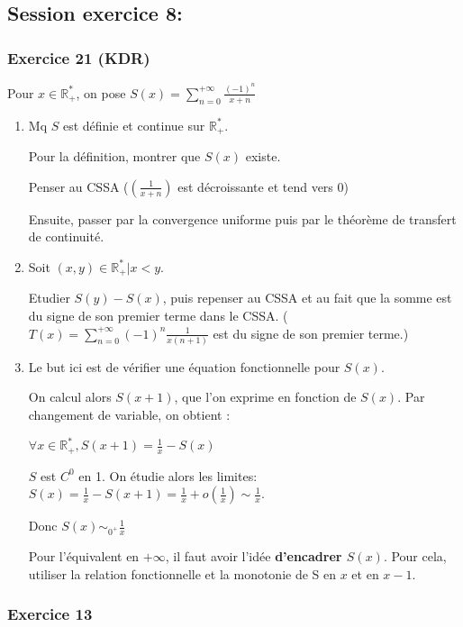 \documentclass[a4paper, 11pt, hidelinks]{article}
\begin{document}
\subsection{Session exercice 8:}


\subsubsection{Exercice 21 (KDR)}

Pour $x\in \mathbb{R}^*_+$, on pose $S(x)=\displaystyle\sum_{n=0}^{+\infty} \frac{(-1)^n}{x+n}$

\begin{enumerate}
    \item Mq $S$ est définie et continue sur $\mathbb{R}^*_+$.
    
    
    Pour la définition, montrer que $S(x)$ existe.

    Penser au CSSA ($(\frac{1}{x+n})$ est décroissante et tend vers $0$)

    Ensuite, passer par la convergence uniforme puis par le théorème de transfert de continuité.
    \item Soit $(x,y)\in \mathbb{R}^*_+ | x<y$.
    
    Etudier $S(y)-S(x)$, puis repenser au CSSA et au fait que la somme est du signe de son premier terme dans le CSSA.
    ($T(x)=\displaystyle\sum_{n=0}^{+ \infty} (-1)^n \frac{1}{x(n+1)}$ est du signe de son premier terme.)
    \item Le but ici est de vérifier une équation fonctionnelle pour $S(x)$.
    
    On calcul alors $S(x+1)$, que l'on exprime en fonction de $S(x)$. Par changement de variable, on obtient :

    $\forall x \in \mathbb{R}^*_+, S(x+1)=\frac{1}{x} - S(x)$

    $S$ est $C^0$ en 1. On étudie alors les limites: $S(x)=\frac{1}{x} - S(x+1)= \frac{1}{x} + o(\frac{1}{x}) \sim \frac{1}{x}$.
    
    Donc $S(x) \sim_{0^+} \frac{1}{x}$

    Pour l'équivalent en $+\infty$, il faut avoir l'idée \textbf{d'encadrer $S(x)$}. Pour cela, utiliser la relation fonctionnelle et la monotonie de S en $x$ et en $x-1$.
\end{enumerate}


\subsubsection{Exercice 13}
\end{document}
